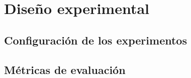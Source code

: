 \chapter{Diseño experimental}

\section{Configuración de los experimentos}

\section{Métricas de evaluación}
